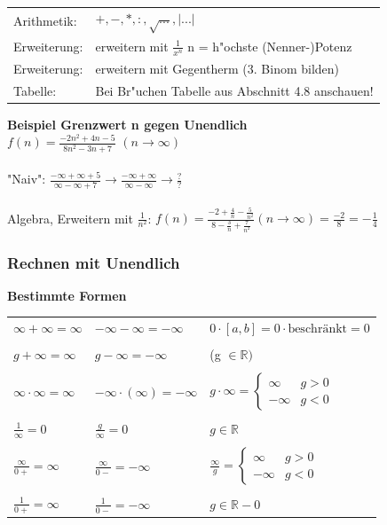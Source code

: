 				\begin{tabular}{ll}
					Arithmetik:  & $+, -, *, :, \sqrt{...}, \vert ...\vert$ \\
					Erweiterung: & erweitern mit $\frac{1}{x^n}$ n = h"ochste (Nenner-)Potenz \\
					Erweiterung: & erweitern mit Gegentherm (3. Binom bilden)\\
					Tabelle:     & Bei Br"uchen Tabelle aus Abschnitt 4.8 anschauen! \\
				\end{tabular}

			\textbf{Beispiel Grenzwert n gegen Unendlich} \\
				$f(n) = \frac{-2n^2+4n-5}{8n^2-3n+7}$ $(n \rightarrow \infty)$ \\
				\\
				"Naiv": $\frac{-\infty + \infty + 5}{\infty - \infty + 7} \rightarrow \frac{-\infty + \infty}{\infty - \infty} \rightarrow \frac{?}{?}$ \\
				\\
				Algebra, Erweitern mit $\frac{1}{n^2}$: $f(n) = \frac{-2+\frac{4}{n}-\frac{5}{n^2}}{8-\frac{3}{n}+\frac{7}{n^2}} (n \rightarrow \infty) = \frac{-2}{8} = -\frac{1}{4}$ \\
				
		
		\subsubsection{Rechnen mit Unendlich}
			\textbf{Bestimmte Formen} \\
				\begin{tabular}{lll}
					$\infty + \infty = \infty$     & $-\infty - \infty = -\infty$          & $0 \cdot [a,b] = 0 \cdot \text{beschränkt} = 0$ \\
					\\
					$g + \infty = \infty$          & $g - \infty = -\infty$                & (g $\in \mathbb{R})$ \\
					\\ 
					$\infty \cdot \infty = \infty$ & $-\infty \cdot (\infty) = -\infty$    & $g \cdot \infty = 
						\begin{cases} 
							\infty & g > 0 \\ 
							-\infty & g < 0 
						\end{cases}$\\ 		
					\\
					$\frac{1}{\infty} = 0$         & $\frac{g}{\infty} = 0$                & $g \in \mathbb{R}$	\\
					\\
					$\frac{\infty}{0+} = \infty$   & $\frac{\infty}{0-} = -\infty$	       & $\frac{\infty}{g} = 
						\begin{cases}			
							\infty & g > 0 \\
							-\infty & g < 0
						\end{cases} $ \\
					\\
					$\frac{1}{0+} = \infty$        & $\frac{1}{0-} = -\infty$              & $g \in \mathbb{R} - {0}$ \\
				\end{tabular}

